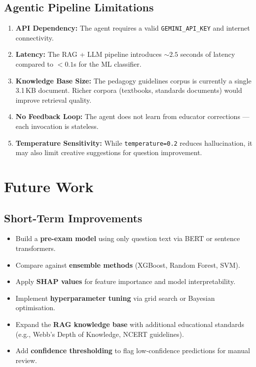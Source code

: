 \documentclass[12pt, a4paper, twoside]{article}
\newcommand{\code}[1]{\texttt{#1}}
\begin{document}
\subsection{Agentic Pipeline Limitations}

\begin{enumerate}[leftmargin=2em]
    \item \textbf{API Dependency:} The agent requires a valid
          \code{GEMINI\_API\_KEY} and internet connectivity.

    \item \textbf{Latency:} The RAG + LLM pipeline introduces
          $\sim 2.5$ seconds of latency compared to $< 0.1$s for
          the ML classifier.

    \item \textbf{Knowledge Base Size:} The pedagogy guidelines corpus
          is currently a single 3.1\,KB document. Richer corpora
          (textbooks, standards documents) would improve retrieval
          quality.

    \item \textbf{No Feedback Loop:} The agent does not learn from
          educator corrections --- each invocation is stateless.

    \item \textbf{Temperature Sensitivity:} While
          \code{temperature=0.2} reduces hallucination, it may also
          limit creative suggestions for question improvement.
\end{enumerate}

\section{Future Work}\label{sec:future}

\subsection{Short-Term Improvements}

\begin{itemize}[leftmargin=2em]
    \item Build a \textbf{pre-exam model} using only question text via
          BERT or sentence transformers.
    \item Compare against \textbf{ensemble methods} (XGBoost, Random
          Forest, SVM).
    \item Apply \textbf{SHAP values} for feature importance and model
          interpretability.
    \item Implement \textbf{hyperparameter tuning} via grid search or
          Bayesian optimisation.
    \item Expand the \textbf{RAG knowledge base} with additional
          educational standards (e.g., Webb's Depth of Knowledge,
          NCERT guidelines).
    \item Add \textbf{confidence thresholding} to flag low-confidence
          predictions for manual review.
\end{itemize}
\end{document}
